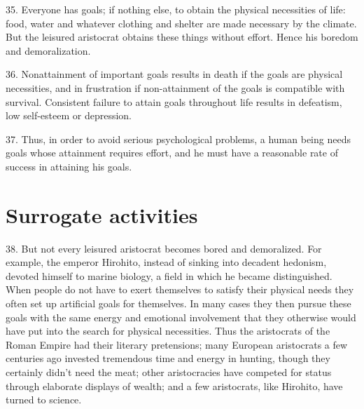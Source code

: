 \documentclass{article}
\begin{document}
35.  Everyone has goals; if nothing else, to obtain the physical necessities of life: food, water and 
whatever  clothing  and  shelter  are  made  necessary  by  the  climate.   But  the  leisured  aristocrat  
obtains these things without effort.  Hence his boredom and demoralization. \vspace{\baselineskip} \newpage

36.  Nonattainment of important goals results in death if the goals are physical necessities, and in 
frustration if non-attainment of the goals is compatible with survival.  Consistent failure to attain 
goals throughout life results in defeatism, low self-esteem or depression. \vspace{\baselineskip}

37.  Thus,  in  order  to  avoid  serious  psychological  problems,  a  human  being  needs  goals  whose  
attainment requires effort, and he must have a reasonable rate of success in attaining his goals. 


\section{Surrogate activities}

\hspace{0.5cm} 38.  But not every leisured aristocrat becomes bored and demoralized.  For example, the emperor 
Hirohito, instead of sinking into decadent hedonism, devoted himself to marine biology, a field in 
which  he  became  distinguished.   When  people  do  not  have  to  exert  themselves  to  satisfy  their  
physical needs they often set up artificial goals for themselves.  In many cases they then pursue 
these goals with the same energy and emotional involvement that they otherwise would have put 
into the search for physical necessities.  Thus the aristocrats of the Roman Empire had their literary 
pretensions; many European aristocrats a few centuries ago invested tremendous time and energy 
in hunting, though they certainly didn’t need the meat; other aristocracies have competed for status 
through elaborate displays of wealth; and a few aristocrats, like Hirohito, have turned to science. \vspace{\baselineskip}
\end{document}
